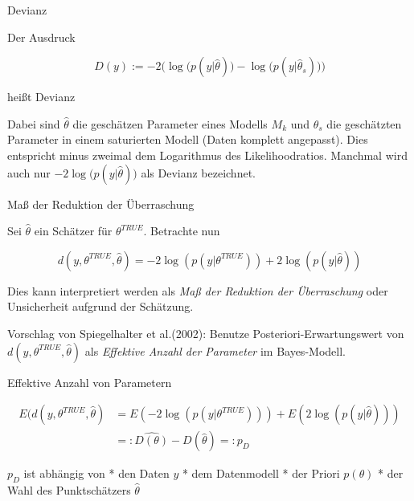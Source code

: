 \documentclass[ignorenonframetext,]{beamer}
\begin{document}
\begin{frame}{Devianz}

Der Ausdruck

\begin{equation*}
D(y) := -2 \Big( \log \big( p(y|\hat\theta)\big)-\log \big(p(y|\hat\theta_s)\big)\Big)
\end{equation*}

heißt Devianz

Dabei sind \(\hat\theta\) die geschätzen Parameter eines Modells \(M_k\)
und \(\hat\theta_s\) die geschätzten Parameter in einem saturierten
Modell (Daten komplett angepasst). Dies entspricht minus zweimal dem
Logarithmus des Likelihoodratios. Manchmal wird auch nur
\(-2 \log \big( p(y|\hat\theta)\big)\) als Devianz bezeichnet.

\end{frame}

\begin{frame}{Maß der Reduktion der Überraschung}

Sei \(\hat{\theta}\) ein Schätzer für \(\theta^{TRUE}\). Betrachte nun

\begin{equation*}
d(y,\theta^{TRUE},\hat{\theta})=-2\log\left(p(y|\theta^{TRUE})\right)+2\log\left(p(y|\hat{\theta})\right)
\end{equation*}

Dies kann interpretiert werden als \emph{Maß der Reduktion der
Überraschung} oder Unsicherheit aufgrund der Schätzung.

Vorschlag von Spiegelhalter et al.(2002): Benutze
Posteriori-Erwartungswert von \(d(y,\theta^{TRUE},\hat{\theta})\) als
\emph{Effektive Anzahl der Parameter} im Bayes-Modell.

\end{frame}

\begin{frame}{Effektive Anzahl von Parametern}

\[\begin{aligned}
E(d(y,\theta^{TRUE},\hat{\theta})&=E(-2\log\left(p(y|\theta^{TRUE})\right))+E(2\log\left(p(y|\hat{\theta})\right))\\
           &=: \hat{D(\theta)}-D(\hat{\theta}) =: p_D
\end{aligned}
\]

\(p_D\) ist abhängig von * den Daten \(y\) * dem Datenmodell * der
Priori \(p(\theta)\) * der Wahl des Punktschätzers \(\hat\theta\)

\end{frame}
\end{document}

